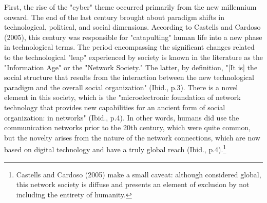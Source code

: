 First, the rise of the "cyber" theme occurred primarily from the new millennium onward. The end of the last century brought about paradigm shifts in technological, political, and social dimensions. According to Castells and Cardoso (2005), this century was responsible for  "catapulting" human life into a new phase in technological terms. The period encompassing the significant changes related to the technological "leap" experienced by society is known in the literature as the "Information Age" or the "Network Society."  The latter, by definition, "[It is] the social structure that results from the interaction between the new technological paradigm and the overall social organization" (Ibid., p.3). There is a novel element in this society, which is the "microelectronic foundation of network technology that provides new capabilities for an ancient form of social organization: in networks" (Ibid., p.4). In other words, humans did use the communication networks prior to the 20th century, which were quite common, but the novelty arises from the nature of the network connections, which are now based on digital technology and have a truly global reach (Ibid., p.4).\footnote{Castells and Cardoso (2005) make a small caveat: although considered global, this network society is diffuse and presents an element of exclusion by not including the entirety of humanity.}

